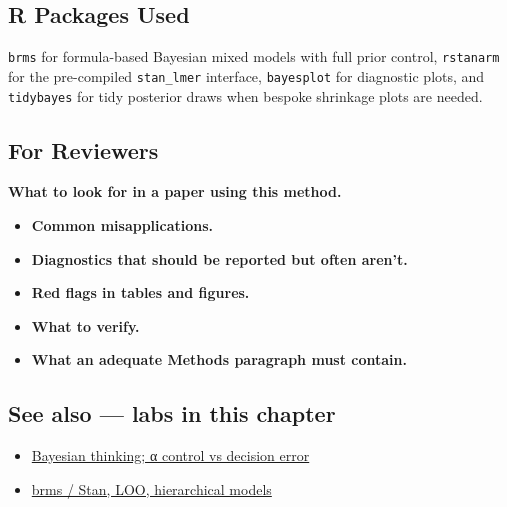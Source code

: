 \documentclass[
]{article}
\providecommand{\tightlist}{%
  \setlength{\itemsep}{0pt}\setlength{\parskip}{0pt}}
\begin{document}
\subsection{R Packages Used}\label{r-packages-used}

\texttt{brms} for formula-based Bayesian mixed models with full prior
control, \texttt{rstanarm} for the pre-compiled \texttt{stan\_lmer}
interface, \texttt{bayesplot} for diagnostic plots, and
\texttt{tidybayes} for tidy posterior draws when bespoke shrinkage plots
are needed.

\subsection{For Reviewers}\label{for-reviewers}

\textbf{What to look for in a paper using this method.}

\begin{itemize}
\tightlist
\item
  \textbf{Common misapplications.}
\item
  \textbf{Diagnostics that should be reported but often aren't.}
\item
  \textbf{Red flags in tables and figures.}
\item
  \textbf{What to verify.}
\item
  \textbf{What an adequate Methods paragraph must contain.}
\end{itemize}

\subsection{See also --- labs in this
chapter}\label{see-also-labs-in-this-chapter}

\begin{itemize}
\tightlist
\item
  \href{labs/lab-bayesian-thinking-control-vs-decision-error.Rmd}{Bayesian
  thinking; α control vs decision error}
\item
  \href{labs/lab-brms-stan-loo-hierarchical-models.Rmd}{brms / Stan,
  LOO, hierarchical models}
\end{itemize}
\end{document}
